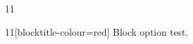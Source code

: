\documentclass[paper=A4]{ropas-poster}
\begin{document}
\begin{postergrid}{1}{1}
\begin{posterblock}{1}{1}[blocktitle-colour=red]
Block option test.
\end{posterblock}
\end{postergrid}
\end{document}
